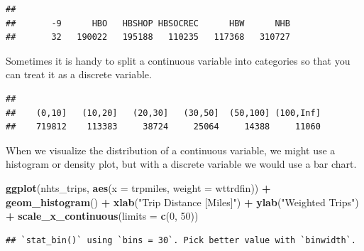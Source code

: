 \documentclass[
]{book}
\newenvironment{Shaded}{\begin{snugshade}}{\end{snugshade}}
\newcommand{\DataTypeTok}[1]{\textcolor[rgb]{0.13,0.29,0.53}{#1}}
\newcommand{\DecValTok}[1]{\textcolor[rgb]{0.00,0.00,0.81}{#1}}
\newcommand{\KeywordTok}[1]{\textcolor[rgb]{0.13,0.29,0.53}{\textbf{#1}}}
\newcommand{\NormalTok}[1]{#1}
\newcommand{\OperatorTok}[1]{\textcolor[rgb]{0.81,0.36,0.00}{\textbf{#1}}}
\newcommand{\OtherTok}[1]{\textcolor[rgb]{0.56,0.35,0.01}{#1}}
\newcommand{\StringTok}[1]{\textcolor[rgb]{0.31,0.60,0.02}{#1}}
\begin{document}
\begin{verbatim}
## 
##       -9      HBO   HBSHOP HBSOCREC      HBW      NHB 
##       32   190022   195188   110235   117368   310727
\end{verbatim}

Sometimes it is handy to split a continuous variable into categories so that you
can treat it as a discrete variable.

\begin{Shaded}
\end{Shaded}

\begin{verbatim}
## 
##    (0,10]   (10,20]   (20,30]   (30,50]  (50,100] (100,Inf] 
##    719812    113383     38724     25064     14388     11060
\end{verbatim}

When we visualize the distribution of a continuous variable, we might
use a histogram or density plot, but with a discrete variable we would use
a bar chart.

\begin{Shaded}
\begin{Highlighting}[]
\KeywordTok{ggplot}\NormalTok{(nhts_trips, }\KeywordTok{aes}\NormalTok{(}\DataTypeTok{x =}\NormalTok{ trpmiles, }\DataTypeTok{weight =}\NormalTok{ wttrdfin)) }\OperatorTok{+}
\StringTok{  }\KeywordTok{geom_histogram}\NormalTok{() }\OperatorTok{+}\StringTok{ }\KeywordTok{xlab}\NormalTok{(}\StringTok{"Trip Distance [Miles]"}\NormalTok{) }\OperatorTok{+}\StringTok{ }\KeywordTok{ylab}\NormalTok{(}\StringTok{"Weighted Trips"}\NormalTok{) }\OperatorTok{+}
\StringTok{  }\KeywordTok{scale_x_continuous}\NormalTok{(}\DataTypeTok{limits =} \KeywordTok{c}\NormalTok{(}\DecValTok{0}\NormalTok{, }\DecValTok{50}\NormalTok{))}
\end{Highlighting}
\end{Shaded}

\begin{verbatim}
## `stat_bin()` using `bins = 30`. Pick better value with `binwidth`.
\end{verbatim}
\end{document}
